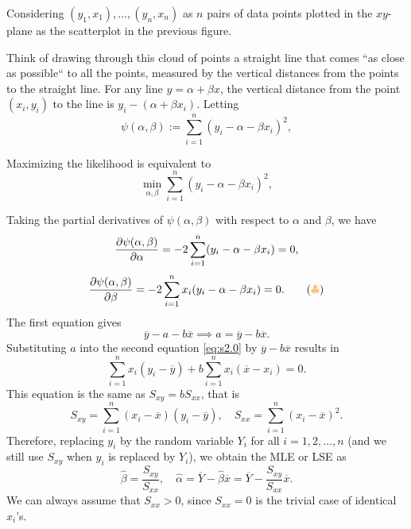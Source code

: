 \begin{example}
Considering $(y_1, x_1), \ldots, (y_n, x_n)$ as $n$ pairs of data points plotted 
in the $xy$-plane as the scatterplot in the previous figure.

Think of drawing through this cloud of points a straight line that comes
``as close as possible`` to all the points, measured by the vertical
 distances from the points to the straight line. For any line 
$y = \alpha + \beta x$, the vertical distance from the point $(x_i, y_i)$ to the line is $y_i - (\alpha + \beta x_i)$.
Letting
\[
    \psi(\alpha, \beta) := \sum_{i=1}^n (y_i - \alpha - \beta x_i)^2,
\]

Maximizing the likelihood is equivalent to
\[
    \min_{\alpha, \beta} \sum_{i=1}^n (y_i - \alpha - \beta x_i)^2,
\]

Taking the partial derivatives of $\psi(\alpha, \beta)$ with respect to $\alpha$ and $\beta$, we have
\[
    \pdv{\psi(\alpha, \beta)}{\alpha} = -2 \sum_{i=1}^n (y_i - \alpha - \beta x_i) = 0,
\]
\[
    \pdv{\psi(\alpha, \beta)}{\beta} = -2 \sum_{i=1}^n x_i (y_i - \alpha - \beta x_i) = 0. \label{eq:s2.0} \tag{{\color{orange!50!white} $\clubsuit $}}
\]
The first equation gives
\[
    \overline{y} - a -b\overline{x} \implies a = \overline{y} - b\overline{x}.
\]
Substituting $a$ into the second equation \eqref{eq:s2.0} by $\overline{y} - b\overline{x}$ results in
\[
    \sum_{i=1}^n x_i (y_i - \overline{y}) + b \sum_{i=1}^n x_i (\overline{x} - x_i) = 0.
\]
This equation is the same as $S_{xy} = b S_{xx}$, that is
\[
    S_{xy} = \sum_{i=1}^n (x_i - \overline{x})(y_i - \overline{y}), \quad S_{xx} = \sum_{i=1}^n (x_i - \overline{x})^2.
\]
Therefore, replacing $y_i$ by the random variable $Y_i$ for all $i = 1, 2, \ldots, n$ (and we 
still use $S_{xy}$ when $y_i$ is replaced by $Y_i$), we obtain the MLE or LSE as 
\begin{equation}
    \widehat{\beta} = \frac{S_{xy}}{S_{xx}}, \quad \widehat{\alpha} = \overline{Y} - \widehat{\beta} \overline{x} = \overline{Y} - \frac{S_{xy}}{S_{xx}} \overline{x}.
\end{equation}
We can always assume that $S_{xx} > 0$, since $S_{xx} = 0$ is the trivial case of identical $x_i$'s.


\end{example}
